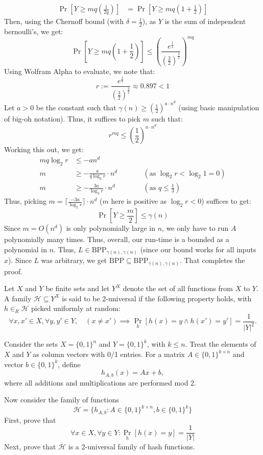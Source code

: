 \documentclass[12pt]{article}
\begin{document}
\begin{solution}
\begin{align*}
        \Pr\left[Y \geq mq\left(\frac{1}{2q}\right)\right] &= \Pr\left[Y \geq mq\left(1+\frac{1}{2}\right)\right]
    \end{align*}
    Then, using the Chernoff bound (with $\delta = \frac{1}{2}$), as $Y$ is the sum of independent bernoulli's, we get: 
    \[\Pr\left[Y \geq mq\left(1+\frac{1}{2}\right)\right] \leq \left(\frac{e^{\frac{1}{2}}}{\left(\frac{3}{2}\right)^{\frac{3}{2}}}\right)^{mq} \]
    Using Wolfram Alpha to evaluate, we note that: 
    \[  r := \frac{e^{\frac{1}{2}}}{\left(\frac{3}{2}\right)^{\frac{3}{2}}} \approx 0.897 < 1\]
    Let $a > 0$ be the constant such that $\gamma(n) \geq  \left(\frac{1}{2}\right)^{a \cdot n^d}$ (using basic manipulation of big-oh notation). Thus, it suffices to pick $m$ such that: 
    \[ r^{mq} \leq \left(\frac{1}{2}\right)^{a \cdot n^d}\]
    Working this out, we get: 
    \begin{align*}
        mq \log_2 r &\leq -an^d \\
        m &\geq -\frac{a}{q\log_2 r} \cdot n^d  \qquad  &&(\text{as } \log_2 r < \log_2 1 = 0) \\
        m & \geq -\frac{3a}{\log_2 r} \cdot n^d \qquad  &&(\text{as } q \leq \frac{1}{3})
    \end{align*}
    Thus, picking $m = \lceil \frac{-3a}{\log_2 r}\rceil \cdot n^d$ ($m$ here is positive as $\log_2 r < 0$) suffices to get:  
    \[ \Pr\left[Y \geq \frac{m}{2}\right] \leq \gamma(n)\]
    Since $m = O(n^d)$ is only polynomially large in $n$, we only have to run $A$ polynomially many times. Thus, overall, our run-time is a bounded as a polynomial in $n$. Thus, $L \in \text{BPP}_{\gamma(n), \gamma(n)}$ (since our bound works for all inputs $x$). Since $L$ was arbitrary, we get $\text{BPP} \subseteq \text{BPP}_{\gamma(n), \gamma(n)}$. That completes the proof. 
\end{solution}


\newpage

\begin{problem}{14}
Let \(X\) and \(Y\) be finite sets and let \(Y^X\) denote the set of all functions from \(X\) to \(Y\).
A family \( \mathcal{H} \subseteq Y^X \) is said to be 2-universal if the following property holds, with \(h \in_R \mathcal{H}\) picked uniformly at random:
\[
\forall x, x' \in X, \forall y, y' \in Y, \quad 
(x \neq x') \implies \Pr_h[h(x) = y \wedge h(x') = y'] = \frac{1}{|Y|^2}.
\]

Consider the sets \(X = \{0,1\}^n\) and \(Y = \{0,1\}^k\), with \(k \le n\).
Treat the elements of \(X\) and \(Y\) as column vectors with 0/1 entries.
For a matrix \(A \in \{0,1\}^{k \times n}\) and vector \(b \in \{0,1\}^k\), define
\[
h_{A,b}(x) = Ax + b,
\]
where all additions and multiplications are performed mod 2.

Now consider the family of functions
\[\mathcal{H} = \{h_{A,b} : A \in \{0,1\}^{k \times n}, b \in \{0,1\}^k\}\]
First, prove that
\[\forall x \in X, \forall y \in Y : \Pr_h[h(x) = y] = \frac{1}{|Y|}\]
Next, prove that \(\mathcal{H}\) is a 2-universal family of hash functions.
\end{problem}
\end{document}
